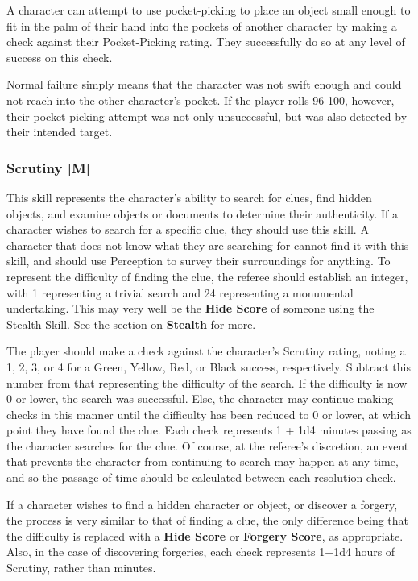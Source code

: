 \documentclass[oneside]{book}
\begin{document}
\begin{multicols}{2}
A character can attempt to use pocket-picking to place an object small enough to fit in the palm of their hand into the pockets of another character by making a check against their Pocket-Picking rating. They successfully do so at any level of success on this check.

Normal failure simply means that the character was not swift enough and could not reach into the other character's pocket. If the player rolls 96-100, however, their pocket-picking attempt was not only unsuccessful, but was also detected by their intended target.

\subsubsection{Scrutiny [M]}
This skill represents the character's ability to search for clues, find hidden objects, and examine objects or documents to determine their authenticity. If a character wishes to search for a specific clue, they should use this skill.  A character that does not know what they are searching for cannot find it with this skill, and should use Perception to survey their surroundings for anything. To represent the difficulty of finding the clue, the referee should establish an integer, with 1 representing a trivial search and 24 representing a monumental undertaking. This may very well be the \textbf{Hide Score} of someone using the Stealth Skill. See the section on \textbf{Stealth} for more.

 The player should make a check against the character's Scrutiny rating, noting a 1, 2, 3, or 4 for a Green, Yellow, Red, or Black success, respectively. Subtract this number from that representing the difficulty of the search. If the difficulty is now 0 or lower, the search was successful. Else, the character may continue making checks in this manner until the difficulty has been reduced to 0 or lower, at which point they have found the clue. Each check represents 1 + 1d4 minutes passing as the character searches for the clue. Of course, at the referee's discretion, an event that prevents the character from continuing to search may happen at any time, and so the passage of time should be calculated between each resolution check. 

If a character wishes to find a hidden character or object, or discover a forgery, the process is very similar to that of finding a clue, the only difference being that the difficulty is replaced with a \textbf{Hide Score} or \textbf{Forgery Score}, as appropriate. Also, in the case of discovering forgeries, each check represents 1+1d4 hours of Scrutiny, rather than minutes. 


\end{multicols}
\end{document}
